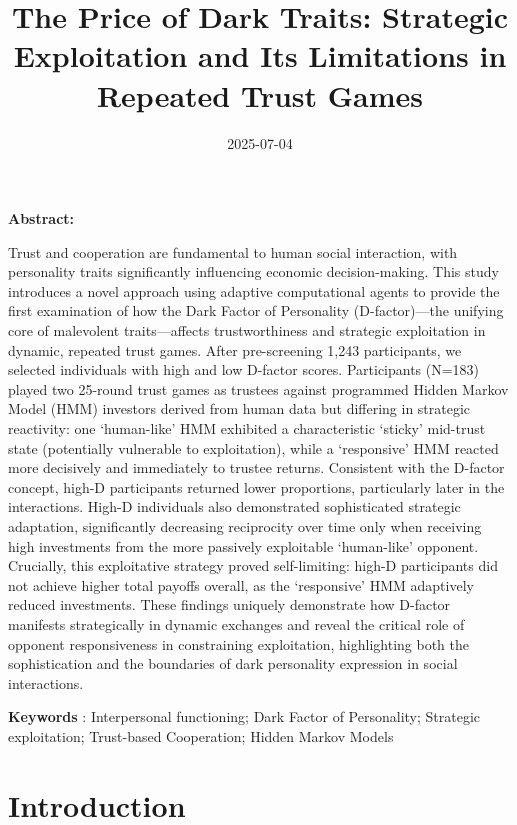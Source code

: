 \documentclass[
]{article}
\title{The Price of Dark Traits: Strategic Exploitation and Its Limitations in Repeated Trust Games}
\author{}
\date{\vspace{-2.5em}2025-07-04}
\begin{document}
\maketitle

\textbf{Abstract:}

Trust and cooperation are fundamental to human social interaction, with personality traits significantly influencing economic decision-making. This study introduces a novel approach using adaptive computational agents to provide the first examination of how the Dark Factor of Personality (D-factor)---the unifying core of malevolent traits---affects trustworthiness and strategic exploitation in dynamic, repeated trust games. After pre-screening 1,243 participants, we selected individuals with high and low D-factor scores. Participants (N=183) played two 25-round trust games as trustees against programmed Hidden Markov Model (HMM) investors derived from human data but differing in strategic reactivity: one `human-like' HMM exhibited a characteristic `sticky' mid-trust state (potentially vulnerable to exploitation), while a `responsive' HMM reacted more decisively and immediately to trustee returns. Consistent with the D-factor concept, high-D participants returned lower proportions, particularly later in the interactions. High-D individuals also demonstrated sophisticated strategic adaptation, significantly decreasing reciprocity over time only when receiving high investments from the more passively exploitable `human-like' opponent. Crucially, this exploitative strategy proved self-limiting: high-D participants did not achieve higher total payoffs overall, as the `responsive' HMM adaptively reduced investments. These findings uniquely demonstrate how D-factor manifests strategically in dynamic exchanges and reveal the critical role of opponent responsiveness in constraining exploitation, highlighting both the sophistication and the boundaries of dark personality expression in social interactions.

\vspace{1cm}

\textbf{Keywords} : Interpersonal functioning; Dark Factor of Personality; Strategic exploitation; Trust-based Cooperation; Hidden Markov Models

\pagebreak

\section{Introduction}\label{introduction}
\end{document}
